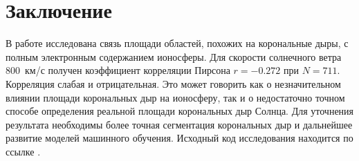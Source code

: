\documentclass[11pt,a4paper]{article}
\begin{document}
\section{Заключение}

В работе исследована связь площади областей, похожих на корональные дыры,
с полным электронным содержанием ионосферы. Для скорости солнечного ветра
800~км/с получен коэффициент корреляции Пирсона $r=-0.272$ при $N=711$.
Корреляция слабая и отрицательная. Это может говорить как о незначительном
влиянии площади корональных дыр на ионосферу, так и о недостаточно точном
способе определения реальной площади корональных дыр Солнца. Для уточнения
результата необходимы более точная сегментация корональных дыр и дальнейшее
развитие моделей машинного обучения. Исходный код исследования находится 
по ссылке .



\end{document}

